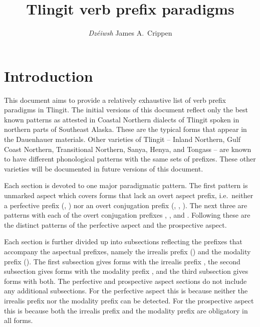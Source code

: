 \documentclass[12pt,letterpaper,landscape,oneside,article]{memoir}
\begin{document}
\pagestyle{mine}

\title{Tlingit verb prefix paradigms}
\author{\textit{Dzéiwsh} James A.\ Crippen}
\maketitle

\begin{KeepFromToc}
\tableofcontents
\end{KeepFromToc}

\section{Introduction}

\begin{multicols}{2}

This document aims to provide a relatively exhaustive list of verb prefix paradigms in Tlingit.
The initial versions of this document reflect only the best known patterns as attested in Coastal Northern dialects of Tlingit spoken in northern parts of Southeast Alaska.
These are the typical forms that appear in the Dauenhauer materials.
Other varieties of Tlingit – Inland Northern, Gulf Coast Northern, Transitional Northern, Sanya, Henya, and Tongass – are known to have different phonological patterns with the same sets of prefixes.
These other varieties will be documented in future versions of this document.

Each section is devoted to one major paradigmatic pattern.
The first pattern is unmarked aspect which covers forms that lack an overt aspect prefix, i.e.\ neither a perfective prefix (, ) nor an overt conjugation prefix (, , ).
The next three are patterns with each of the overt conjugation prefixes , , and .
Following these are the distinct patterns of the perfective aspect and the prospective aspect.

Each section is further divided up into subsections reflecting the prefixes that accompany the aspectual prefixes, namely the irrealis prefix () and the modality prefix ().
The first subsection gives forms with the irrealis prefix , the second subsection gives forms with the modality prefix , and the third subsection gives forms with both.
The perfective and prospective aspect sections do not include any additional subsections.
For the perfective aspect this is because neither the irrealis prefix nor the modality prefix can be detected.
For the prospective aspect this is because both the irrealis prefix  and the modality prefix  are obligatory in all forms.


\end{multicols}
\end{document}
